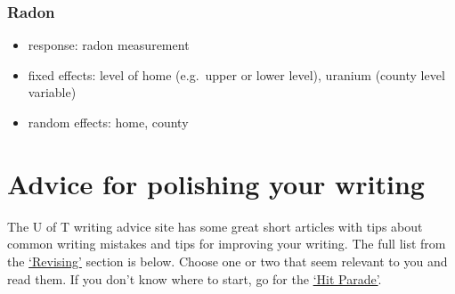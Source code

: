 \documentclass[
  openany]{book}
\providecommand{\tightlist}{%
  \setlength{\itemsep}{0pt}\setlength{\parskip}{0pt}}
\begin{document}
\hypertarget{radon}{%
\subsubsection{Radon}\label{radon}}

\begin{itemize}
\tightlist
\item
  response: radon measurement
\item
  fixed effects: level of home (e.g.~upper or lower level), uranium (county level variable)
\item
  random effects: home, county
\end{itemize}

\hypertarget{advice-for-polishing-your-writing}{%
\section{Advice for polishing your writing}\label{advice-for-polishing-your-writing}}

The U of T writing advice site has some great short articles with tips about common writing mistakes and tips for improving your writing. The full list from the \href{https://advice.writing.utoronto.ca/revising/}{`Revising'} section is below. Choose one or two that seem relevant to you and read them. If you don't know where to start, go for the \href{https://advice.writing.utoronto.ca/revising/hit-parade-of-errors/}{`Hit Parade'}.
\end{document}

